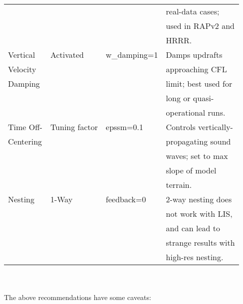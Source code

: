 \begin{tabular}{|l|l|l|l|}
             &               &                     & real-data cases;    \\
             &               &                     & used in RAPv2 and   \\
             &               &                     & HRRR.\\ \hline
Vertical     & Activated     & w\_damping=1        & Damps updrafts      \\
Velocity     &               &                     & approaching CFL     \\
Damping      &               &                     & limit; best used for\\
             &               &                     & long or quasi-      \\
             &               &                     & operational runs. \\ \hline
Time Off-    & Tuning factor & epssm=0.1           & Controls vertically-\\
Centering    &               &                     & propagating sound   \\
             &               &                     & waves; set to max   \\
             &               &                     & slope of model      \\
             &               &                     & terrain. \\ \hline
Nesting      & 1-Way         & feedback=0          & 2-way nesting does  \\
             &               &                     & not work with LIS,  \\
             &               &                     & and can lead to     \\
             &               &                     & strange results with\\
             &               &                     & high-res nesting.   \\ \hline
\end{tabular}\\
\\

The above recommendations have some caveats: 


